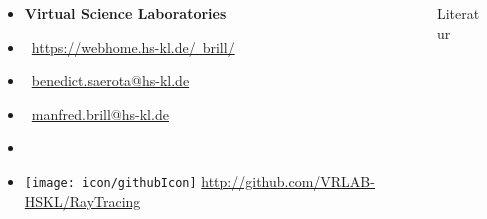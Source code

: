 \documentclass[final,hyperref={pdfpagelabels=false}]{beamer}
\begin{document}
\begin{frame}[t]
\begin{columns}
\begin{column}{0.325\textwidth}
\begin{itemize}
\item[] \textbf{\large Virtual Science Laboratories}
\item[] \faGlobe\ \href{https://webhome.hs-kl.de/~brill/}{https://webhome.hs-kl.de/~brill/} 
\item[] \Letter\ \href{benedict.saerota@hs-kl.de}{benedict.saerota@hs-kl.de}
\item[] \Letter\ \href{manfred.brill@hs-kl.de}{manfred.brill@hs-kl.de}
\item[]
\item[] \texttt{[image: icon/githubIcon]} \href{https://github.com/VRLAB-HSKL/RayTracing}{http://github.com/VRLAB-HSKL/RayTracing}

\end{itemize}
\end{column}


\begin{column}{0.465\textwidth}
\nocite{*}
\begin{block}{Literatur}
 
 \nocite{pries:19}
 
\end{block}
\end{column}

\begin{column}{0.025\textwidth}\end{column} %


\end{columns}

\end{frame} %
\end{document}
